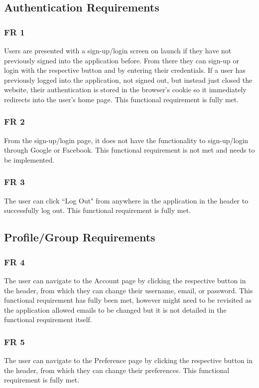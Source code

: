 \documentclass[12pt, titlepage]{article}
\begin{document}
\subsection{Authentication Requirements}
\subsubsection{FR 1}
Users are presented with a sign-up/login screen on launch if they have not previously signed into the application before. From there they can sign-up or login with the respective button and by entering their credentials. If a user has previously logged into the application, not signed out, but instead just closed the website, their authentication is stored in the browser's cookie so it immediately redirects into the user's home page. This functional requirement is fully met.

\subsubsection{FR 2}
From the sign-up/login page, it does not have the functionality to sign-up/login through Google or Facebook. This functional requirement is not met and needs to be implemented.

\subsubsection{FR 3}
The user can click ``Log Out" from anywhere in the application in the header to successfully log out. This functional requirement is fully met.

\subsection{Profile/Group Requirements}
\subsubsection{FR 4}
The user can navigate to the Account page by clicking the respective button in the header, from which they can change their username, email, or password. This functional requirement has fully been met, however might need to be revisited as the application allowed emails to be changed but it is not detailed in the functional requirement itself.

\subsubsection{FR 5}
The user can navigate to the Preference page by clicking the respective button in the header, from which they can change their preferences. This functional requirement is fully met.
\end{document}
